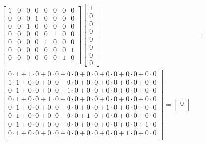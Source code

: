 \begin{figure}[H]
\begin{align*}
\begin{bmatrix}
            1 & 0 & 0 & 0 & 0 & 0 & 0 & 0\\
            0 & 0 & 0 & 1 & 0 & 0 & 0 & 0\\
            0 & 0 & 1 & 0 & 0 & 0 & 0 & 0\\
            0 & 0 & 0 & 0 & 0 & 1 & 0 & 0\\
            0 & 0 & 0 & 0 & 1 & 0 & 0 & 0\\
            0 & 0 & 0 & 0 & 0 & 0 & 0 & 1\\
            0 & 0 & 0 & 0 & 0 & 0 & 1 & 0\\
        \end{bmatrix}
        \begin{bmatrix}
            1\\
            0\\
            0\\
            0\\
            0\\
            0\\
            0\\
            0
        \end{bmatrix}
        &=\\
        \begin{bmatrix}
            0\cdot 1 + 1\cdot 0 + 0\cdot 0 + 0\cdot 0 + 0\cdot 0 + 0\cdot 0 + 0\cdot 0 + 0\cdot 0\\
            1\cdot 1 + 0\cdot 0 + 0\cdot 0 + 0\cdot 0 + 0\cdot 0 + 0\cdot 0 + 0\cdot 0 + 0\cdot 0\\
            0\cdot 1 + 0\cdot 0 + 0\cdot 0 + 1\cdot 0 + 0\cdot 0 + 0\cdot 0 + 0\cdot 0 + 0\cdot 0\\
            0\cdot 1 + 0\cdot 0 + 1\cdot 0 + 0\cdot 0 + 0\cdot 0 + 0\cdot 0 + 0\cdot 0 + 0\cdot 0\\
            0\cdot 1 + 0\cdot 0 + 0\cdot 0 + 0\cdot 0 + 0\cdot 0 + 1\cdot 0 + 0\cdot 0 + 0\cdot 0\\
            0\cdot 1 + 0\cdot 0 + 0\cdot 0 + 0\cdot 0 + 1\cdot 0 + 0\cdot 0 + 0\cdot 0 + 0\cdot 0\\
            0\cdot 1 + 0\cdot 0 + 0\cdot 0 + 0\cdot 0 + 0\cdot 0 + 0\cdot 0 + 0\cdot 0 + 1\cdot 0\\
            0\cdot 1 + 0\cdot 0 + 0\cdot 0 + 0\cdot 0 + 0\cdot 0 + 0\cdot 0 + 1\cdot 0 + 0\cdot 0\\
        \end{bmatrix}
        =
        \begin{bmatrix}
            0\\

\end{bmatrix}
\end{align*}
\end{figure}
